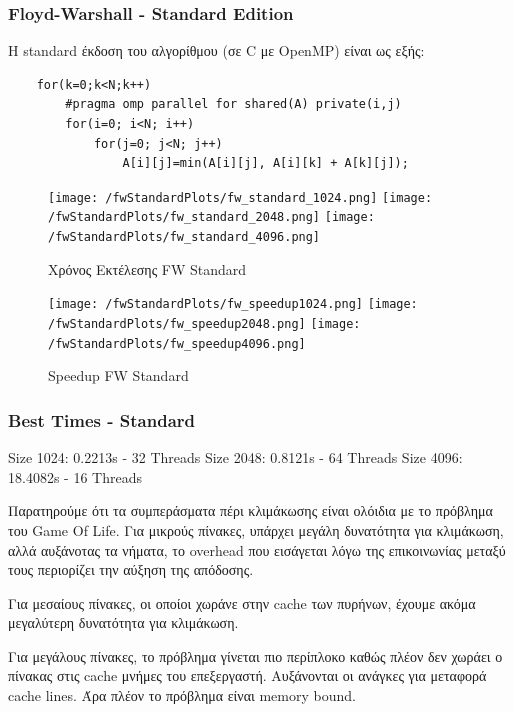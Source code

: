 \documentclass[letterpaper,12pt]{article}
\begin{document}
\subsubsection{Floyd-Warshall - Standard Edition}
Η standard έκδοση του αλγορίθμου (σε C με OpenMP) είναι ως εξής:

\begin{lstlisting}
    for(k=0;k<N;k++)
        #pragma omp parallel for shared(A) private(i,j)
        for(i=0; i<N; i++)
            for(j=0; j<N; j++)
                A[i][j]=min(A[i][j], A[i][k] + A[k][j]);
\end{lstlisting}

\begin{figure}[H]
    \centering
    \texttt{[image: /fwStandardPlots/fw\_standard\_1024.png]}
    \texttt{[image: /fwStandardPlots/fw\_standard\_2048.png]}
    \texttt{[image: /fwStandardPlots/fw\_standard\_4096.png]}
    \caption{Χρόνος Εκτέλεσης FW Standard}
    \label{fig:Χρόνος Εκτέλεσης FW Standard}
\end{figure}

\begin{figure}[H]
    \centering
    \texttt{[image: /fwStandardPlots/fw\_speedup1024.png]}
    \texttt{[image: /fwStandardPlots/fw\_speedup2048.png]}
    \texttt{[image: /fwStandardPlots/fw\_speedup4096.png]}
    \caption{Speedup FW Standard}
    \label{fig:Speedup FW Standard}
\end{figure}

\subsubsection*{Best Times - Standard}
Size 1024: 0.2213s - 32 Threads
\newline
Size 2048: 0.8121s - 64 Threads
\newline
Size 4096: 18.4082s - 16 Threads
\newline

Παρατηρούμε ότι τα συμπεράσματα πέρι κλιμάκωσης είναι ολόιδια με το πρόβλημα του Game Of Life.
Για μικρούς πίνακες, υπάρχει μεγάλη δυνατότητα για κλιμάκωση, αλλά αυξάνοτας τα νήματα, το overhead
που εισάγεται λόγω της επικοινωνίας μεταξύ τους περιορίζει την αύξηση της απόδοσης.

Για μεσαίους πίνακες, οι οποίοι χωράνε στην cache των πυρήνων, έχουμε ακόμα μεγαλύτερη δυνατότητα για κλιμάκωση.

Για μεγάλους πίνακες, το πρόβλημα γίνεται πιο περίπλοκο καθώς πλέον δεν χωράει ο πίνακας στις cache μνήμες του επεξεργαστή.
Αυξάνονται οι ανάγκες για μεταφορά cache lines. Άρα πλέον το πρόβλημα είναι memory bound. 
\end{document}
